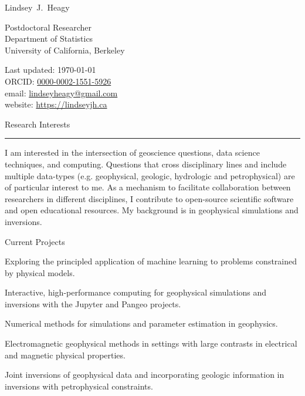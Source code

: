 \documentclass[a4paper, 11pt]{article}
\makeatletter
\newcommand{\firstname}{Lindsey}
\newcommand{\middleinitial}{J.}
\newcommand{\lastname}{Heagy}
\newcommand{\emailaddress}{lindseyheagy@gmail.com}
\newcommand{\email}{\href{mailto:\emailaddress}{\emailaddress}}
\newcommand{\websiteurl}{https://lindseyjh.ca}
\newcommand{\website}{\href{\websiteurl}{\websiteurl}}
\newcommand{\ORCIDNumber}{0000-0002-1551-5926}
\newcommand{\ORCID}{\href{https://orcid.org/\ORCIDNumber}{\ORCIDNumber}}
\newcommand{\position}{Postdoctoral Researcher}
\newcommand{\affiliation}{
    Department of Statistics \\
    University of California, Berkeley
}
\newcommand{\fullname}{\firstname\ \middleinitial\  \lastname}
\newcommand{\mytitle}[1]{
    {%
    \Huge #1
    }\\[0.05cm]
}
\newcommand{\heading}[1]{
    \begin{minipage}[t]{\textwidth}
    \vspace{0.05cm}
    {\LARGE #1}\\
    \vspace{-0.24cm}
    \hrule
    \end{minipage}
    \vspace{0.05cm}

}
\newcommand{\subheading}[1]{
    \vspace{0.4cm}
    {\Large #1}\\
    \vspace{-0.2cm}
}
\makeatother
\begin{document}
\thispagestyle{empty}


\mytitle{\fullname}
\begin{minipage}[t]{0.595\textwidth}
    \position \\
    \affiliation
\end{minipage}
\begin{minipage}[t]{0.4\textwidth}
    \begin{flushright}
        Last updated: \monthyear\today
        \\
        ORCID: \ORCID
        \\
        email: \email
        \\
        website: \website
    \end{flushright}
\end{minipage}


\heading{Research Interests}

I am interested in the intersection of geoscience questions, data science techniques, and computing.
Questions that cross disciplinary lines and include multiple data-types (e.g. geophysical, geologic, hydrologic and petrophysical) are of particular interest to me.
As a mechanism to facilitate collaboration between researchers in different disciplines, I contribute to open-source scientific software and open educational resources.
My background is in geophysical simulations and inversions.

\subheading{Current Projects}
\begin{myitemize}
    \item{Exploring the principled application of machine learning to problems constrained by physical models.}
    \item{Interactive, high-performance computing for geophysical simulations and inversions with the Jupyter and Pangeo projects.}
    \item{Numerical methods for simulations and parameter estimation in geophysics.}
    \item{Electromagnetic geophysical methods in settings with large contrasts in electrical and magnetic physical properties.}
    \item{Joint inversions of geophysical data and incorporating geologic information in inversions with petrophysical constraints.}
\end{myitemize}
\end{document}
